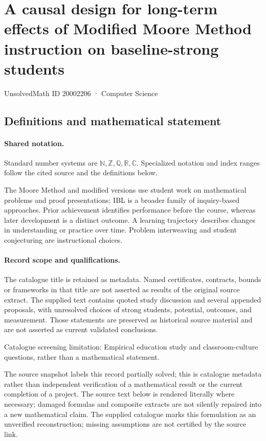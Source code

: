 \documentclass[11pt]{article}
\begin{document}
\setcounter{section}{20002205}
\section{A causal design for long-term effects of Modified Moore Method instruction on baseline-strong students}\label{20002206}
{\small\sffamily UnsolvedMath ID 20002206 · Computer Science}
\subsection{Definitions and mathematical statement}

\paragraph{Shared notation.}Standard number systems are $\mathbb N,\mathbb Z,\mathbb Q,\mathbb R,\mathbb C$. Specialized notation and index ranges follow the cited source and the definitions below.


The Moore Method and modified versions use student work on mathematical problems and proof presentations; IBL is a broader family of inquiry-based approaches. Prior achievement identifies performance before the course, whereas later development is a distinct outcome. A learning trajectory describes changes in understanding or practice over time. Problem interweaving and student conjecturing are instructional choices.
\paragraph{Record scope and qualifications.}
The catalogue title is retained as metadata. Named certificates, contracts, bounds or frameworks in that title are not asserted as results of the original source extract.
The supplied text contains quoted study discussion and several appended proposals, with unresolved choices of strong students, potential, outcomes, and measurement. Those statements are preserved as historical source material and are not asserted as current validated conclusions.

Catalogue screening limitation: Empirical education study and classroom-culture questions, rather than a mathematical statement.

The source snapshot labels this record partially solved; this is catalogue metadata rather than independent verification of a mathematical result or the current completion of a project.
The source text below is rendered literally where necessary; damaged formulas and composite extracts are not silently repaired into a new mathematical claim.
The supplied catalogue marks this formulation as an unverified reconstruction; missing assumptions are not certified by the source link.
\end{document}
